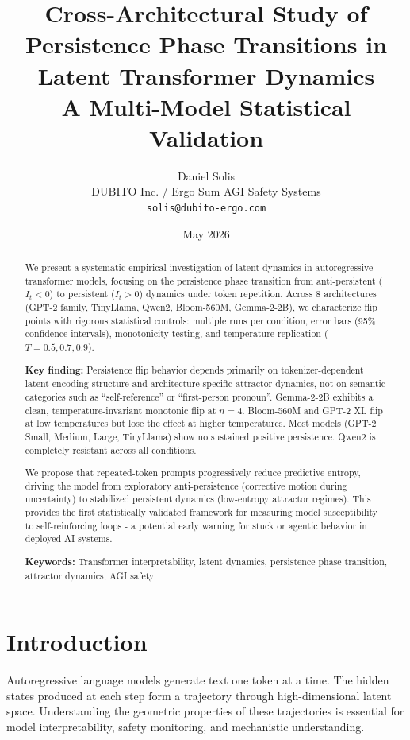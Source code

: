 \documentclass[12pt,a4paper]{article}
\title{Cross-Architectural Study of Persistence Phase Transitions in Latent Transformer Dynamics\\
\large A Multi-Model Statistical Validation}
\author{Daniel Solis\\
\small DUBITO Inc. / Ergo Sum AGI Safety Systems\\
\small \texttt{solis@dubito-ergo.com}}
\date{May 2026}
\begin{document}
\maketitle

\begin{abstract}
We present a systematic empirical investigation of latent dynamics in autoregressive transformer models, focusing on the persistence phase transition from anti-persistent ($I_t < 0$) to persistent ($I_t > 0$) dynamics under token repetition. Across 8 architectures (GPT-2 family, TinyLlama, Qwen2, Bloom-560M, Gemma-2-2B), we characterize flip points with rigorous statistical controls: multiple runs per condition, error bars (95\% confidence intervals), monotonicity testing, and temperature replication ($T = 0.5, 0.7, 0.9$).

\textbf{Key finding:} Persistence flip behavior depends primarily on tokenizer-dependent latent encoding structure and architecture-specific attractor dynamics, not on semantic categories such as ``self-reference'' or ``first-person pronoun''. Gemma-2-2B exhibits a clean, temperature-invariant monotonic flip at $n=4$. Bloom-560M and GPT-2 XL flip at low temperatures but lose the effect at higher temperatures. Most models (GPT-2 Small, Medium, Large, TinyLlama) show no sustained positive persistence. Qwen2 is completely resistant across all conditions.

We propose that repeated-token prompts progressively reduce predictive entropy, driving the model from exploratory anti-persistence (corrective motion during uncertainty) to stabilized persistent dynamics (low-entropy attractor regimes). This provides the first statistically validated framework for measuring model susceptibility to self-reinforcing loops - a potential early warning for stuck or agentic behavior in deployed AI systems.

\textbf{Keywords:} Transformer interpretability, latent dynamics, persistence phase transition, attractor dynamics, AGI safety
\end{abstract}

\section{Introduction}

Autoregressive language models generate text one token at a time. The hidden states produced at each step form a trajectory through high-dimensional latent space. Understanding the geometric properties of these trajectories is essential for model interpretability, safety monitoring, and mechanistic understanding.
\end{document}
